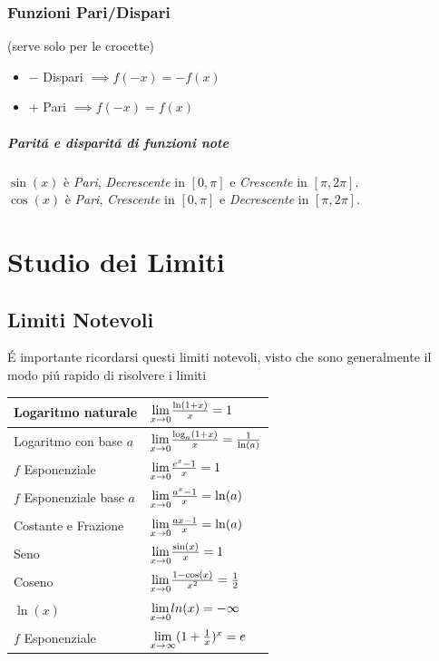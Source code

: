 \documentclass[12pt, a4paper, openany]{book}
\begin{document}
\subsection{Funzioni Pari/Dispari}
\small{(serve solo per le crocette)}
\begin{itemize}
	\item $-$ Dispari $\implies f(-x)=-f(x)$
	\item $+$ Pari $\implies f(-x)=f(x)$
\end{itemize}
\paragraph*{Paritá e disparitá di funzioni note}

$\sin(x)$ è \emph{Pari}, \emph{Decrescente} in $[0,\pi]$ e \emph{Crescente} in $[\pi,2\pi]$.
\\$\cos(x)$ è \emph{Pari}, \emph{Crescente} in $[0,\pi]$ e \emph{Decrescente} in $[\pi,2\pi]$.


\chapter{Studio dei Limiti}

\section{Limiti Notevoli}
É importante ricordarsi questi limiti notevoli, visto che sono generalmente il modo piú rapido di risolvere i limiti

\begin{tabularx}{\textwidth}{ |X|X| }
	\hline
	Logaritmo naturale        & $\underset{x \to 0}{\lim} \frac{\ln(1+x)}{x} = 1 $                   \\
	\hline
	Logaritmo con base $a$    & $\underset{x \to 0}{\lim} \frac{\log_a(1+x)}{x} = \frac{1}{\ln(a)} $ \\
	\hline
	$f$ Esponenziale          & $\underset{x \to 0}{\lim} \frac{e^x-1}{x} = 1$                       \\
	\hline
	$f$ Esponenziale base $a$ & $\underset{x \to 0}{\lim} \frac{a^x-1}{x} = \ln(a)$                  \\
	\hline
	Costante e Frazione       & $\underset{x \to 0}{\lim}\frac{ax -1}{x} = \ln(a)$                   \\
	\hline
	Seno                      & $\underset{x \to 0}{\lim}\frac{\sin(x)}{x} = 1$                      \\
	\hline
	Coseno                    & $\underset{x \to 0}{\lim} \frac{1-\cos(x)}{x^2} = \frac{1}{2} $      \\
	\hline
	\hline
	$\ln(x)$                  & $\underset{x \to 0}{\lim} ln(x) = -\infty $                          \\ %
	\hline
	$f$ Esponenziale          & $\underset{x \to \infty}{\lim} (1+\frac{1}{x})^x = e$                       \\
	\hline
\end{tabularx}
\end{document}
